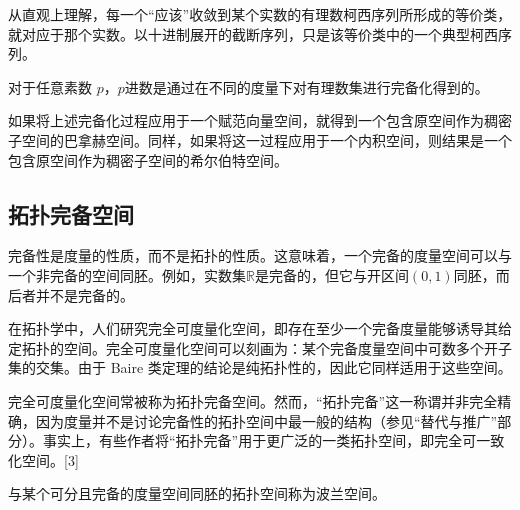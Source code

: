 从直观上理解，每一个“应该”收敛到某个实数的有理数柯西序列所形成的等价类，就对应于那个实数。以十进制展开的截断序列，只是该等价类中的一个典型柯西序列。

对于任意素数 $p$，$p$进数是通过在不同的度量下对有理数集进行完备化得到的。

如果将上述完备化过程应用于一个赋范向量空间，就得到一个包含原空间作为稠密子空间的巴拿赫空间。同样，如果将这一过程应用于一个内积空间，则结果是一个包含原空间作为稠密子空间的希尔伯特空间。
\subsection{拓扑完备空间}
完备性是度量的性质，而不是拓扑的性质。这意味着，一个完备的度量空间可以与一个非完备的空间同胚。例如，实数集$\mathbb{R}$是完备的，但它与开区间$(0,1)$同胚，而后者并不是完备的。

在拓扑学中，人们研究完全可度量化空间，即存在至少一个完备度量能够诱导其给定拓扑的空间。完全可度量化空间可以刻画为：某个完备度量空间中可数多个开子集的交集。由于 Baire 类定理的结论是纯拓扑性的，因此它同样适用于这些空间。

完全可度量化空间常被称为拓扑完备空间。然而，“拓扑完备”这一称谓并非完全精确，因为度量并不是讨论完备性的拓扑空间中最一般的结构（参见“替代与推广”部分）。事实上，有些作者将“拓扑完备”用于更广泛的一类拓扑空间，即完全可一致化空间。[3]

与某个可分且完备的度量空间同胚的拓扑空间称为波兰空间。
